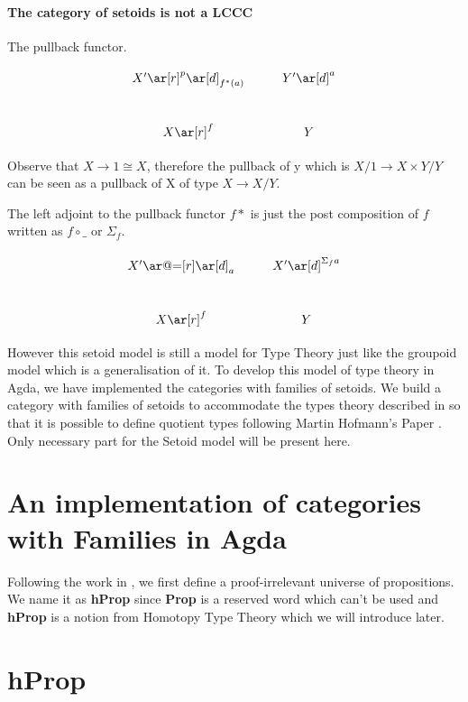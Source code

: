 


\paragraph{The category of setoids is not a LCCC}

The pullback functor.

\begin{displaymath}
    \xymatrix{X' \ar[r]^{p} \ar[d]_{f^{*}(a)} & Y' \ar[d]^a \\
      X \ar[r]^f& Y }
\end{displaymath}


Observe that $X \rightarrow 1 \cong X$, therefore the pullback of y which is
$X/1 \rightarrow X \times Y / Y$ can be seen as a pullback of X of type $X \rightarrow
X/Y$.

The left adjoint to the pullback functor $f*$ is just the post
composition of $f$ written as $f \circ\_$ or $\Sigma_f$.

\begin{displaymath}
    \xymatrix{X' \ar@{=}[r] \ar[d]_{a} & X' \ar[d]^{\Sigma_f a} \\
      X \ar[r]^f& Y }
\end{displaymath}


However this setoid model is still a model for Type
Theory just like the groupoid model which is a generalisation of it.
To develop this model of type theory in Agda, we have implemented the
categories with families of setoids. 
We build a category with families of setoids to accommodate the types theory described in
\cite{alti:lics99}  so that it is possible to define quotient types
following Martin Hofmann's Paper \cite{hof:95:sm}.  Only necessary
part for the Setoid model will be present here.


\section{An implementation of categories with Families in Agda}

Following the work in \cite{alti:99}, we first define a
proof-irrelevant universe of propositions. We name it as \textbf{hProp}
since \textbf{Prop} is a  reserved word which can't be used and
\textbf{hProp} is a notion from Homotopy Type Theory which we will introduce later.

\section{hProp}


